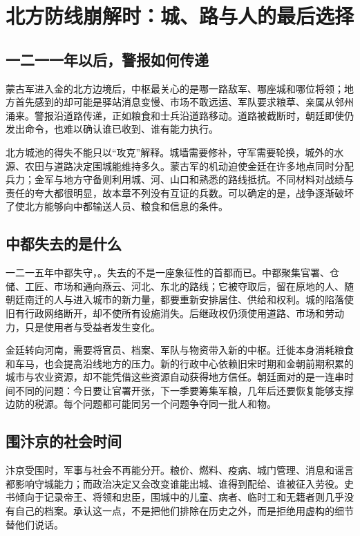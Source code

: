 \section{北方防线崩解时：城、路与人的最后选择}

\subsection{一二一一年以后，警报如何传递}

蒙古军进入金的北方边境后，中枢最关心的是哪一路敌军、哪座城和哪位将领；地方首先感到的却可能是驿站消息变慢、市场不敢远运、军队要求粮草、亲属从邻州涌来。警报沿道路传递，正如粮食和士兵沿道路移动。道路被截断时，朝廷即使仍发出命令，也难以确认谁已收到、谁有能力执行。

北方城池的得失不能只以“攻克”解释。城墙需要修补，守军需要轮换，城外的水源、农田与道路决定围城能维持多久。蒙古军的机动迫使金廷在许多地点同时分配兵力；金军与地方守备则利用城、河、山口和熟悉的路线抵抗。不同材料对战绩与责任的夸大都很明显，故本章不列没有互证的兵数。可以确定的是，战争逐渐破坏了使北方能够向中都输送人员、粮食和信息的条件。

\subsection{中都失去的是什么}

一二一五年中都失守，。失去的不是一座象征性的首都而已。中都聚集官署、仓储、工匠、市场和通向燕云、河北、东北的路线；它被夺取后，留在原地的人、随朝廷南迁的人与进入城市的新力量，都要重新安排居住、供给和权利。城的陷落使旧有行政网络断开，却不使所有设施消失。后继政权仍须使用道路、市场和劳动力，只是使用者与受益者发生变化。

金廷转向河南，需要将官员、档案、军队与物资带入新的中枢。迁徙本身消耗粮食和车马，也会提高沿线地方的压力。新的行政中心依赖旧宋时期和金朝前期积累的城市与农业资源，却不能凭借这些资源自动获得地方信任。朝廷面对的是一连串时间不同的问题：今日要让官署开张，下一季要筹集军粮，几年后还要恢复能够支撑边防的税源。每个问题都可能同另一个问题争夺同一批人和物。

\subsection{围汴京的社会时间}

汴京受围时，军事与社会不再能分开。粮价、燃料、疫病、城门管理、消息和谣言都影响守城能力；而政治决定又会改变谁能出城、谁得到配给、谁被征入劳役。史书倾向于记录帝王、将领和忠臣，围城中的儿童、病者、临时工和无籍者则几乎没有自己的档案。承认这一点，不是把他们排除在历史之外，而是拒绝用虚构的细节替他们说话。

